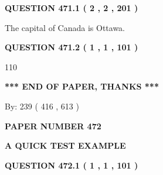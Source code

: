 \documentclass[12pt]{article}
\begin{document}
{\textbf{\Large{QUESTION
471.1 
 ( 2 , 2 , 201 )
}}}
  
  
 
 
\noindent{}
 
 
The capital of Canada is Ottawa.
 
 
 
 
  
\vspace{0.2in}
  
{\textbf{\Large{QUESTION
471.2 
 ( 1 , 1 , 101 )
}}}
  
  
 
 
\noindent{}

110
 
 
   
   
 \vspace{0.2in}
 
   
   
   
   
\vspace{1.0in} 
{\textbf{\large{ *** END OF PAPER, THANKS *** }}} 
   
   
\hspace{1.0in} By: 
 239 ( 416 ,  613 )
   
   
   
   
\newpage 
\setcounter{page}{ 
   472001 } 
   
   
   
   
 {\textbf{ \Large{ PAPER NUMBER  472  }}}
   
   
\vspace{0.2in}
   
   
   
   
   
   
 \vspace{0.2in}
{\LARGE {\textbf{ A QUICK TEST EXAMPLE}}}
   
   
  
\vspace{0.2in}
  
{\textbf{\Large{QUESTION
472.1 
 ( 1 , 1 , 101 )
}}}
  
  
 
 
\noindent{}
\end{document}
